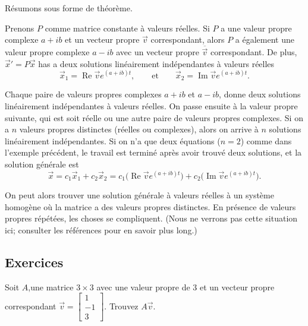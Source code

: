 \medskip

Résumons sous forme de théorème.

\begin{theorem}
Prenons $P$ comme matrice constante à valeurs réelles. Si $P$ a une valeur propre complexe $a+ib$ et un vecteur propre
$\vec{v}$ correspondant, alors $P$ a également une valeur propre complexe $a-ib$ avec un vecteur propre $\overline{\vec{v}}$ correspondant.
De plus,
${\vec{x}}' = P\vec{x}$ has
a deux solutions linéairement indépendantes à valeurs réelles
\begin{equation*}
\vec{x}_1 = \operatorname{Re} \vec{v} e^{(a+ib)t} ,
\qquad
\text{et}
\qquad
\vec{x}_2 = \operatorname{Im} \vec{v} e^{(a+ib)t} .
\end{equation*}
\end{theorem}

Chaque paire de valeurs propres complexes $a+ib$ et $a-ib$,
donne deux solutions linéairement indépendantes à valeurs réelles. On passe ensuite à la valeur propre suivante, qui est soit réelle ou une autre paire de valeurs propres complexes. Si on a $n$ valeurs propres distinctes (réelles ou complexes), alors on arrive à $n$ solutions linéairement indépendantes. Si on n’a que deux équations ($n=2$) comme dans l'exemple précédent, le travail est terminé après avoir trouvé deux solutions, et la solution générale est
\begin{equation*}
\vec{x} =
c_1 \vec{x}_1 + c_2 \vec{x}_2
= 
c_1 \bigl( \operatorname{Re} \vec{v} e^{(a+ib)t} \bigr) +
c_2 \bigl( \operatorname{Im} \vec{v} e^{(a+ib)t} \bigr)
.
\end{equation*}

On peut alors trouver une solution générale à valeurs réelles à un système homogène où la matrice a des valeurs propres distinctes. En présence de valeurs propres répétées, les choses se compliquent.  
(Nous ne verrons pas cette situation ici; consulter les références pour en savoir plus long.)

\subsection{Exercices}

\begin{exercise}[facile]
Soit $A$,une matrice $3 \times 3$ avec une valeur propre de 3 et un vecteur propre correspondant $\vec{v} =
\left[ \begin{smallmatrix} 1 \\ -1 \\ 3 \end{smallmatrix} \right]$.
Trouvez $A \vec{v}$.
\end{exercise}


